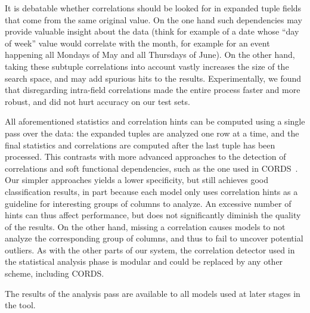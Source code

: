 It is debatable whether correlations should be looked for in expanded tuple fields that come from the same original value. On the one hand such dependencies may provide valuable insight about the data (think for example of a date whose ``day of week'' value would correlate with the month, for example for an event happening all Mondays of May and all Thursdays of June). On the other hand, taking these subtuple correlations into account vastly increases the size of the search space, and may add spurious hits to the results. Experimentally, we found that disregarding intra-field correlations made the entire process faster and more robust, and did not hurt accuracy on our test sets.

All aforementioned statistics and correlation hints can be computed using a single pass over the data: the expanded tuples are analyzed one row at a time, and the final statistics and correlations are computed after the last tuple has been processed. This contrasts with more advanced approaches to the detection of correlations and soft functional dependencies, such as the one used in CORDS~\cite{Ilyas2004}. Our simpler approaches yields a lower specificity, but still achieves good classification results, in part because each model only uses correlation hints as a guideline for interesting groups of columns to analyze. An excessive number of hints can thus affect performance, but does not significantly diminish the quality of the results. On the other hand, missing a correlation causes models to not analyze the corresponding group of columns, and thus to fail to uncover potential outliers. As with the other parts of our system, the correlation detector used in the statistical analysis phase is modular and could be replaced by any other scheme, including CORDS.

The results of the analysis pass are available to all models used at later stages in the tool.
